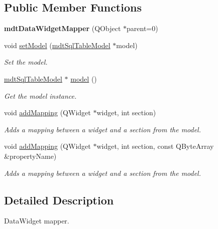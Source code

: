 \subsection*{Public Member Functions}
\begin{DoxyCompactItemize}
\item 
\hypertarget{classmdt_data_widget_mapper_a0569659cfdde7a3be8626d0c0e1f785e}{
{\bfseries mdtDataWidgetMapper} (QObject $\ast$parent=0)}
\label{classmdt_data_widget_mapper_a0569659cfdde7a3be8626d0c0e1f785e}

\item 
void \hyperlink{classmdt_data_widget_mapper_af2f866ef24395911b1aca49a7ce7ca3e}{setModel} (\hyperlink{classmdt_sql_table_model}{mdtSqlTableModel} $\ast$model)
\begin{DoxyCompactList}\small\item\em Set the model. \end{DoxyCompactList}\item 
\hypertarget{classmdt_data_widget_mapper_ab01a124254cf4b2795b800c8c4df04d0}{
\hyperlink{classmdt_sql_table_model}{mdtSqlTableModel} $\ast$ \hyperlink{classmdt_data_widget_mapper_ab01a124254cf4b2795b800c8c4df04d0}{model} ()}
\label{classmdt_data_widget_mapper_ab01a124254cf4b2795b800c8c4df04d0}

\begin{DoxyCompactList}\small\item\em Get the model instance. \end{DoxyCompactList}\item 
void \hyperlink{classmdt_data_widget_mapper_a02a1109d55f5c553667a7fb9c02e70c1}{addMapping} (QWidget $\ast$widget, int section)
\begin{DoxyCompactList}\small\item\em Adds a mapping between a widget and a section from the model. \end{DoxyCompactList}\item 
void \hyperlink{classmdt_data_widget_mapper_a9bb91385d70c7017db79507af0ed8960}{addMapping} (QWidget $\ast$widget, int section, const QByteArray \&propertyName)
\begin{DoxyCompactList}\small\item\em Adds a mapping between a widget and a section from the model. \end{DoxyCompactList}\end{DoxyCompactItemize}


\subsection{Detailed Description}
DataWidget mapper. 

